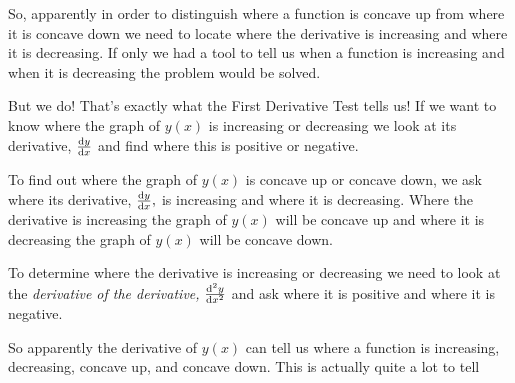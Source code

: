 So, apparently in order to distinguish where a function is concave up
from where it is concave down we need to locate where the derivative
is increasing and where it is decreasing.  If only we had a tool to
tell us when a function is increasing and when it is decreasing the
problem would be solved.

But we do! That's exactly what the First Derivative Test tells us! If
we want to know where the graph of $y(x)$ is increasing or decreasing
we look at its derivative, $\frac{\text{d}{y}}{\text{d}{x}}$ and find where this is
positive or negative.

To find out where the graph of $y(x)$ is concave up or concave down,
we ask where its derivative, $\frac{\text{d}{y}}{\text{d}{x}},$ is increasing and where it
is decreasing. Where the derivative is increasing the graph of $y(x)$
will be concave up and where it is decreasing the graph of $y(x)$ will
be concave down.

To determine where the derivative is increasing or decreasing we need
to look at the \emph{derivative of the derivative,} $\frac{\text{d}^{2}{y}}{\text{d}{x}^{2}}$
and ask where it is positive and where it is negative.


So apparently the derivative of $y(x)$ can tell us where a function is
increasing, decreasing, concave up, and concave down. This is actually quite a lot to tell 



